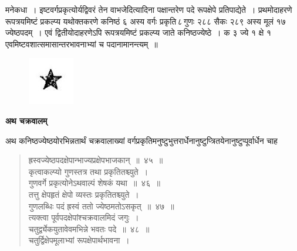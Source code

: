 \documentclass[11pt, openany]{book}
\begin{document}
\newpage%

\noindent मनेकधा~। इष्टवर्गप्रकृत्योर्यद्विवरं तेन वाभजेदित्यादिना पक्षान्तरेण पदे
रूपक्षेपे प्रतिपाद्येते~। प्रथमोदाहरणे रूपत्रयमिष्टं प्रकल्प्य यथोक्तकरणे कनिष्ठं ६ 
अस्य वर्गः प्रकृति\textendash \,८\textendash \,गुणः २८८ सैकः २८९ अस्य मूलं १७ ज्येष्ठपदम्~। एवं द्वितीयोदाहरणेऽपि रूपत्रयमिष्टं प्रकल्प्य जाते कनिष्ठज्येष्ठे~। क ३ ज्ये १ क्षे १ एवमिष्टवशात्समासान्तरभावनाभ्यां च पदानामानन्त्यम्~॥

\vspace{3cm}
\begin{figure}[h!]
    \centering
    \includegraphics[scale=0.8]{Graphics/Capture2.JPG}
    
\end{figure}
\newpage
 \label{chakra}
\begin{center}
    \textbf{\LARGE अथ चक्रवालम्}
\end{center}
 
  \vspace{2mm}
 अथ कनिष्ठज्येष्ठयोरभिन्नतार्थं चक्रवालाख्यां वर्गप्रकृतिमनुष्टुभुत्तरार्धेनानुष्टुप्त्रितयेनानुष्टुप्पूर्वार्धेन चाह\textendash
\begin{quote}
    \bs
      ह्रस्वज्येष्ठपदक्षेपान्भाज्यप्रक्षेपभाजकान्~॥~४५~॥~\\

\vspace{-5mm}
 कृत्वाकल्प्यो गुणस्तत्र तथा प्रकृतितश्च्युते~। \\
 गुणवर्गे प्रकृत्योनेऽथवाल्पं शेषकं यथा~॥~४६~॥~\\

\vspace{-5mm}
 तत्तु क्षेपहृतं क्षेपो व्यस्तः प्रकृतितश्च्युते~। \\
 गुणलब्धिः पदं ह्रस्वं ततो ज्येष्ठमतोऽसकृत्~॥~४७~॥~\\

 \vspace{-5mm}
 त्यक्त्वा पूर्वपदक्षेपांश्चक्रवालमिदं जगुः~। \\
 चतुर्द्व्येकयुतावेवमभिन्ने भवतः पदे~॥~४८~॥~\\

 \vspace{-5mm}
 चतुर्द्विक्षेपमूलाभ्यां रूपक्षेपार्थभावना~। 
\end{quote}
\end{document}
